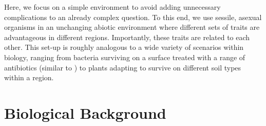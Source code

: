 Here, we focus on a simple environment to avoid adding unnecessary complications to an already complex question. To this end, we use sessile, asexual  organisms in an unchanging abiotic environment where different sets of traits are advantageous in different regions. Importantly, these traits are related to each other. This set-up is roughly analogous to a wide variety of scenarios within biology, ranging from bacteria surviving on a surface treated with a range of antibiotics (similar to \citep{baym_spatiotemporal_2016}) to plants adapting to survive on different soil types within a region. 



\section{Biological Background}

